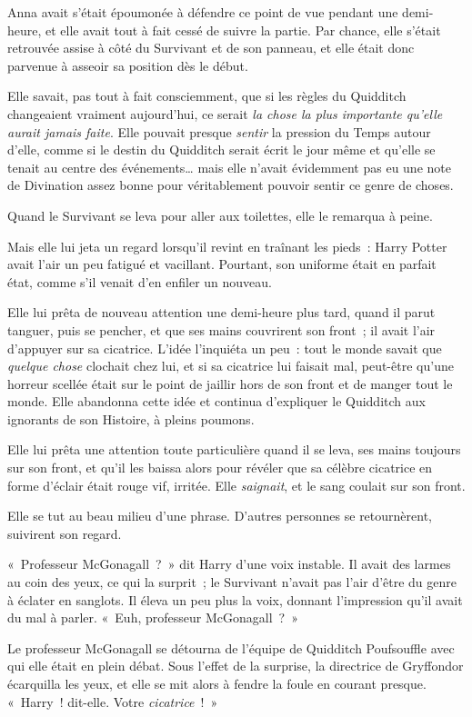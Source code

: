 Anna avait s'était époumonée à défendre ce point de vue pendant une demi-heure, et elle avait tout à fait cessé de suivre la partie. Par chance, elle s'était retrouvée assise à côté du Survivant et de son panneau, et elle était donc parvenue à asseoir sa position dès le début.

Elle savait, pas tout à fait consciemment, que si les règles du Quidditch changeaient vraiment aujourd'hui, ce serait \emph{la chose la plus importante qu'elle aurait jamais faite}. Elle pouvait presque \emph{sentir} la pression du Temps autour d'elle, comme si le destin du Quidditch serait écrit le jour même et qu'elle se tenait au centre des événements… mais elle n'avait évidemment pas eu une note de Divination assez bonne pour véritablement pouvoir sentir ce genre de choses.

Quand le Survivant se leva pour aller aux toilettes, elle le remarqua à peine.

Mais elle lui jeta un regard lorsqu'il revint en traînant les pieds~: Harry Potter avait l'air un peu fatigué et vacillant. Pourtant, son uniforme était en parfait état, comme s'il venait d'en enfiler un nouveau.

Elle lui prêta de nouveau attention une demi-heure plus tard, quand il parut tanguer, puis se pencher, et que ses mains couvrirent son front~; il avait l'air d'appuyer sur sa cicatrice. L'idée l'inquiéta un peu~: tout le monde savait que \emph{quelque chose} clochait chez lui, et si sa cicatrice lui faisait mal, peut-être qu'une horreur scellée était sur le point de jaillir hors de son front et de manger tout le monde. Elle abandonna cette idée et continua d'expliquer le Quidditch aux ignorants de son Histoire, à pleins poumons.

Elle lui prêta une attention toute particulière quand il se leva, ses mains toujours sur son front, et qu'il les baissa alors pour révéler que sa célèbre cicatrice en forme d'éclair était rouge vif, irritée. Elle \emph{saignait}, et le sang coulait sur son front.

Elle se tut au beau milieu d'une phrase. D'autres personnes se retournèrent, suivirent son regard.

«~Professeur McGonagall~?~» dit Harry d'une voix instable. Il avait des larmes au coin des yeux, ce qui la surprit~; le Survivant n'avait pas l'air d'être du genre à éclater en sanglots. Il éleva un peu plus la voix, donnant l'impression qu'il avait du mal à parler. «~Euh, professeur McGonagall~?~»

Le professeur McGonagall se détourna de l'équipe de Quidditch Poufsouffle avec qui elle était en plein débat. Sous l'effet de la surprise, la directrice de Gryffondor écarquilla les yeux, et elle se mit alors à fendre la foule en courant presque. «~Harry~! dit-elle. Votre \emph{cicatrice}~!~»

